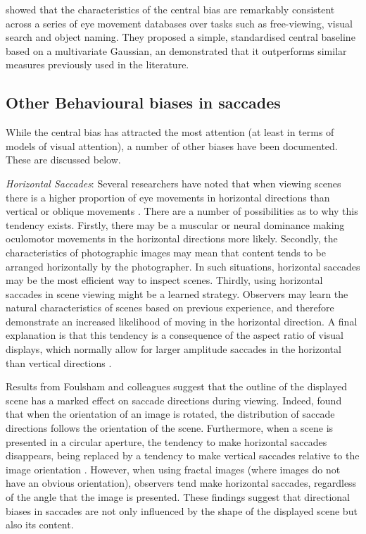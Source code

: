 \cite{clarke-tatler2014} showed that the characteristics of the central bias are remarkably consistent across a series of eye movement databases over tasks such as free-viewing, visual search and object naming. They proposed a simple, standardised central baseline based on a multivariate Gaussian, an demonstrated that it outperforms similar measures previously used in the literature.

\subsection{Other Behavioural biases in saccades}
While the central bias has attracted the most attention (at least in terms of models of visual attention), a number of other biases have been documented. These are discussed below. 

\textit{Horizontal Saccades}: Several researchers have noted that when viewing scenes there is a higher proportion of eye movements in horizontal directions than vertical or oblique movements \citep[e.g.][]{gilchrist2006,foulsham2008,tatler2008,lappe1998,lee2002}. There are a number of possibilities as to why this tendency exists. Firstly, there may be a muscular or neural dominance making oculomotor movements in the horizontal directions more likely. Secondly, the characteristics of photographic images may mean that content tends to be arranged horizontally by the photographer. In such situations, horizontal saccades may be the most efficient way to inspect scenes. Thirdly, using horizontal saccades in scene viewing might be a learned strategy. Observers may learn the natural characteristics of scenes based on previous experience, and therefore demonstrate an increased likelihood of moving in the horizontal direction. A final explanation is that this tendency is a consequence of the aspect ratio of visual displays, which normally allow for larger amplitude saccades in the horizontal than vertical directions \citep{wartburg2007}.

Results from Foulsham and colleagues suggest that the outline of the displayed scene has a marked effect on saccade directions during viewing. Indeed, \cite{foulsham2008} found that when the orientation of an image is rotated, the distribution of saccade directions follows the orientation of the scene. Furthermore, when a scene is presented in a circular aperture, the tendency to make horizontal saccades disappears, being replaced by a tendency to make vertical saccades relative to the image orientation \citep{foulsham-kingstone2010}. However, when using fractal images (where images do not have an obvious orientation), observers tend make horizontal saccades, regardless of the angle that the image is presented. These findings suggest that directional biases in saccades are not only influenced by the shape of the displayed scene but also its content.

